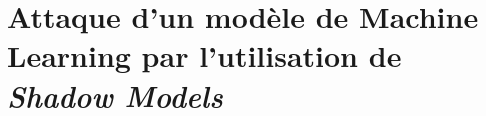 \part{Attaque d'un modèle de Machine Learning par l'utilisation de \textit{Shadow Models}}
    
    
    